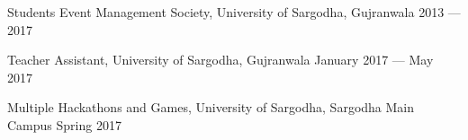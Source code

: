 Students Event Management Society, University of Sargodha, Gujranwala	\hfill 2013 --- 2017
 
Teacher Assistant, University of Sargodha, Gujranwala	\hfill January 2017 --- May 2017




Multiple Hackathons and Games, University of Sargodha, Sargodha Main Campus	\hfill Spring 2017


